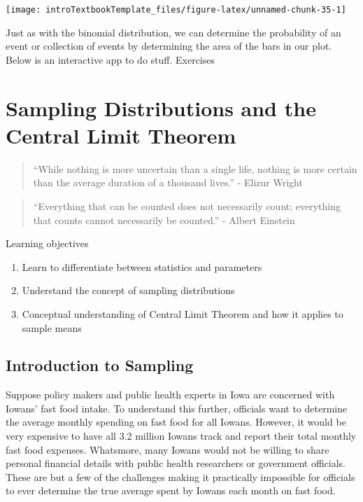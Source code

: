 \documentclass[
]{book}
\providecommand{\tightlist}{%
  \setlength{\itemsep}{0pt}\setlength{\parskip}{0pt}}
\theoremstyle{definition}
\theoremstyle{definition}
\theoremstyle{definition}
\theoremstyle{remark}
\begin{document}
\begin{center}\texttt{[image: introTextbookTemplate\_files/figure-latex/unnamed-chunk-35-1]} \end{center}

Just as with the binomial distribution, we can determine the probability of an event or collection of events by determining the area of the bars in our plot. Below is an interactive app to do stuff. Exercises

\hypertarget{ch6}{%
\chapter{\texorpdfstring{Sampling Distributions and the Central Limit Theorem}{Sampling Distributions and the   Central Limit Theorem}}\label{ch6}}

\begin{quote}
``While nothing is more uncertain than a single life, nothing is more certain than the average duration of a thousand lives.'' - Elizur Wright
\end{quote}

\begin{quote}
``Everything that can be counted does not necessarily count; everything that counts cannot necessarily be counted.'' - Albert Einstein
\end{quote}

Learning objectives

\begin{enumerate}
\def\labelenumi{\arabic{enumi}.}
\tightlist
\item
  Learn to differentiate between statistics and parameters\\
\item
  Understand the concept of sampling distributions\\
\item
  Conceptual understanding of Central Limit Theorem and how it applies to sample means
\end{enumerate}

\hypertarget{introduction-to-sampling}{%
\section{Introduction to Sampling}\label{introduction-to-sampling}}

Suppose policy makers and public health experts in Iowa are concerned with Iowans' fast food intake. To understand this further, officials want to determine the average monthly spending on fast food for all Iowans. However, it would be very expensive to have all 3.2 million Iowans track and report their total monthly fast food expenses. Whatsmore, many Iowans would not be willing to share personal financial details with public health researchers or government officials. These are but a few of the challenges making it practically impossible for officials to ever determine the true average spent by Iowans each month on fast food.
\end{document}

